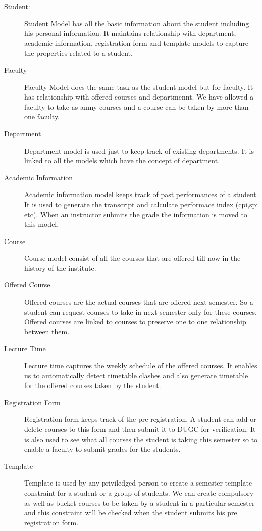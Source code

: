 \documentclass[12pt]{article}
\begin{document}
\begin{description}
\item[Student:]
Student Model has all the basic information about the student including his
personal information. It maintains relationship with department, academic
information, registration form and template models to capture the properties
related to a student.
\item[Faculty]
Faculty Model does the same task as the student model but for faculty. It has
relationship with offered courses and departmennt. We have allowed a faculty
to take as amny courses and a course can be taken by more than one faculty.
\item[Department]
Department model is used just to keep track of existing departments. It is
linked to all the models which have the concept of department.
\item[Academic Information]
Academic information model keeps track of past performances of a student. It
is used to generate the transcript and calculate performace index (cpi,spi
etc). When an instructor submits the grade the information is moved to this
model.
\item[Course]
Course model consist of all the courses that are offered till now in the
history of the institute.
\item[Offered Course]
Offered courses are the actual courses that are offered next semester. So a
student can request courses to take in next semester only for these
courses. Offered courses are linked to courses to preserve one to one
relationship between them.
\item[Lecture Time]
Lecture time captures the weekly schedule of the offered courses. It enables
us to automatically detect timetable clashes and also generate timetable
for the offered courses taken by the student.
\item[Registration Form]
Registration form keeps track of the pre-registration. A student can add or
delete courses to this form and then submit it to DUGC for verification. It is
also used to see what all courses the student is taking this semester so to
enable a faculty to submit grades for the students.
\item[Template]
Template is used by any priviledged person to create a semester template
constraint for a student or a group of students. We can create compulsory as
well as bucket courses to be taken by a student in a particular semester and
this constraint will be checked when the student submits his pre registration
form.
\end{description}
\end{document}
